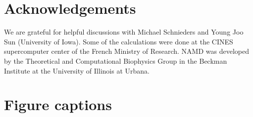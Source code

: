\documentclass[12pt]{article}
\begin{document}
\section*{Acknowledgements}
We are grateful for helpful discussions with Michael Schnieders and Young Joo Sun (University of Iowa). Some of
the calculations were done at the CINES supercomputer center of the French Ministry of Research. NAMD was developed by
the Theoretical and Computational Biophysics Group in the Beckman Institute at the University of Illinois at Urbana.

\small 


\clearpage
\pagebreak

\section*{Figure captions}
\end{document}
